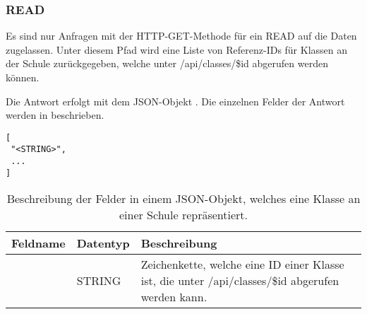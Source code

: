 \subsubsection{READ}
\label{sec:rest:api:schools:classes:read}
Es sind nur Anfragen mit der HTTP-GET-Methode für ein READ auf die Daten zugelassen.
Unter diesem Pfad wird eine Liste von Referenz-IDs für Klassen an der Schule zurückgegeben, welche unter /api/classes/\$id abgerufen werden können.

Die Antwort erfolgt mit dem JSON-Objekt . 
Die einzelnen Felder der Antwort werden in  beschrieben.


\begin{lstlisting}[caption={JSON-Antwort für einen GET-Aufruf des Pfads /api/schools/\$id/classes},label={lst:code:rest:api:schools:classes:read:ret},frame=tlrb]
[
 "<STRING>",
 ...
]
\end{lstlisting}
\begin{longtable}{|p{}|p{}|p{}|}
		\caption{Beschreibung der Felder in einem JSON-Objekt, welches eine Klasse an einer Schule repräsentiert.}
\endfoot
		\caption{Beschreibung der Felder in einem JSON-Objekt, welches eine Klasse an einer Schule repräsentiert.}
		\label{tab:rest:api:schools:classes:read:ret:json}
\endlastfoot 
\hline
			\textbf{Feldname} & \textbf{Datentyp} & \textbf{Beschreibung} \\ \hline
\endhead
 & STRING & Zeichenkette, welche eine ID einer Klasse ist, die unter /api/classes/\$id abgerufen werden kann. \\ \hline
\end{longtable}
